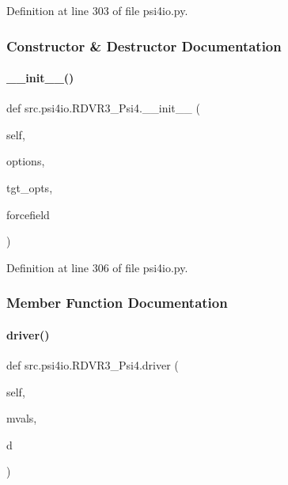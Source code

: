 Definition at line 303 of file psi4io.\+py.



\subsubsection{Constructor \& Destructor Documentation}
\mbox{\label{classsrc_1_1psi4io_1_1RDVR3__Psi4_a53e16387e30639e452ed481c17e185c4}} 
\paragraph{\texorpdfstring{\+\_\+\+\_\+init\+\_\+\+\_\+()}{\_\_init\_\_()}}
{\footnotesize\ttfamily def src.\+psi4io.\+R\+D\+V\+R3\+\_\+\+Psi4.\+\_\+\+\_\+init\+\_\+\+\_\+ (\begin{DoxyParamCaption}\item[{}]{self,  }\item[{}]{options,  }\item[{}]{tgt\+\_\+opts,  }\item[{}]{forcefield }\end{DoxyParamCaption})}



Definition at line 306 of file psi4io.\+py.



\subsubsection{Member Function Documentation}
\mbox{\label{classsrc_1_1psi4io_1_1RDVR3__Psi4_a27e2839718816408337e0a2422add630}} 
\paragraph{\texorpdfstring{driver()}{driver()}}
{\footnotesize\ttfamily def src.\+psi4io.\+R\+D\+V\+R3\+\_\+\+Psi4.\+driver (\begin{DoxyParamCaption}\item[{}]{self,  }\item[{}]{mvals,  }\item[{}]{d }\end{DoxyParamCaption})}



